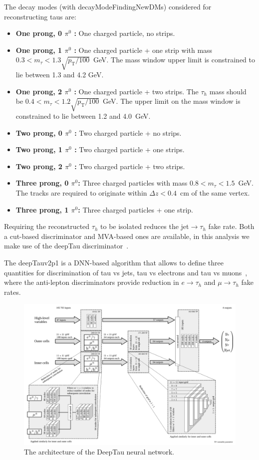 The decay modes (with decayModeFindingNewDMs) considered for reconstructing taus are:
\begin{itemize}
\item \textbf{One prong, 0 $\pi^0$ :} One charged particle, no strips.
\item \textbf{One prong, 1 $\pi^0$ :} One charged particle + one strip with mass $ 0.3 < m_{\tau} < 1.3 \sqrt{p_{\text{T}}/100}$~GeV. The mass window upper limit is constrained to lie between 1.3 and 4.2 GeV.
\item \textbf{One prong, 2 $\pi^0$ :} One charged particle + two strips. The $\tau_{h}$ mass should be $0.4 < m_{\tau} < 1.2\sqrt{p_{\text{T}}/100}$~GeV. The upper limit on the mass window is constrained to lie between 1.2 and 4.0~GeV.
\item \textbf{Two prong, 0 $\pi^0$ :} Two charged particle + no strips.
\item \textbf{Two prong, 1 $\pi^0$ :} Two charged particle + one strips.
\item \textbf{Two prong, 2 $\pi^0$ :} Two charged particle + two strips.
\item \textbf{Three prong, 0 $\pi^0$: } Three charged particles with mass $0.8 < m_{\tau} < 1.5$~GeV. The tracks are required to originate within $\Delta z<0.4$~cm of the same vertex.
\item \textbf{Three prong, 1 $\pi^0$: } Three charged particles + one strip.
\end{itemize}

Requiring the reconstructed $\tau_{h}$ to be isolated reduces the
jet$\rightarrow\tau_{h}$ fake rate. Both a cut-based discriminator and  MVA-based
ones are available, in this analysis we make use of the deepTau discriminator~\cite{CMS-DP-2019-033}.

The deepTauv2p1 is a DNN-based algorithm that allows to define three quantities for discrimination of tau vs jets, tau vs electrons and tau vs muons~\cite{TauPOG}, where the anti-lepton discriminators provide reduction in $e\rightarrow\tau_h$ and $\mu\rightarrow\tau_h$ fake rates. 

\begin{figure}[!hbtp]
\centering
    \includegraphics[width=\textwidth]{Figures/deeptau.pdf}
\caption{The architecture of the DeepTau neural network.}
\label{fig:4tau_ccc}
\end{figure}